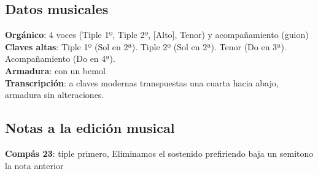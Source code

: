 \subsection*{Datos musicales}
\noindent \textbf{Orgánico}: 4 voces (Tiple 1º, Tiple 2º, [Alto], Tenor) y acompañamiento (guion)\\
\textbf{Claves altas}: Tiple 1º (Sol en 2ª). Tiple 2º (Sol en 2ª). Tenor (Do en 3ª). Acompañamiento (Do en 4ª).\\
\textbf{Armadura}: con un bemol\\
\textbf{Transcripción}: a claves modernas transpuestas una cuarta hacia abajo, armadura sin alteraciones.

\subsection*{Notas a la edición musical}
\noindent \textbf{Compás 23}: tiple primero, Eliminamos el sostenido prefiriendo baja un semitono la nota anterior
